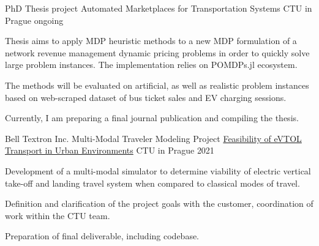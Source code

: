 

\begin{cventries}

  \cventry
    {PhD Thesis project} %
    {Automated Marketplaces for Transportation Systems} %
    {CTU in Prague} %
    {ongoing} %
    {
      \begin{cvitems} %
        \item {Thesis aims to apply MDP heuristic methods to a new MDP formulation of a network revenue management dynamic pricing problems in order to quickly solve large problem instances. The implementation relies on POMDPs.jl ecosystem.}
        \item {The methods will be evaluated on artificial, as well as realistic problem instances based on web-scraped dataset of bus ticket sales and EV charging sessions.}
        \item {Currently, I am preparing a final journal publication and compiling the thesis.}
      \end{cvitems}
    }

  \cventry
    {Bell Textron Inc. Multi-Modal Traveler Modeling Project} %
    {\href{https://www.aic.fel.cvut.cz/projects/passenger-decision-modeling-in-a-multi-modal-urban-environment}{Feasibility of eVTOL Transport in Urban Environments}} %
    {CTU in Prague} %
    {2021} %
    {
      \begin{cvitems} %
        \item {Development of a multi-modal simulator to determine viability of electric vertical take-off and landing travel system when compared to classical modes of travel.}
        \item {Definition and clarification of the project goals with the customer, coordination of work within the CTU team.}
        \item {Preparation of final deliverable, including codebase. }
      \end{cvitems}
    }


\end{cventries}
